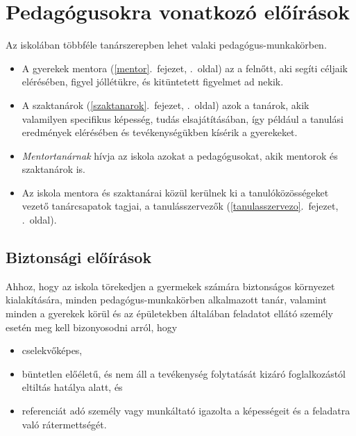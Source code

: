 \hypertarget{pedagogusokra-vonatkozo-eloirasok}{%
\section{Pedagógusokra vonatkozó
előírások}\label{pedagogusokra-vonatkozo-eloirasok}}

Az iskolában többféle tanárszerepben lehet valaki pedagógus-mun\-ka\-kör\-ben.

\begin{itemize}
\tightlist
\item
  A gyerekek mentora (\ref{mentor}.~fejezet, \pageref{mentor}.~oldal)
  az a felnőtt, aki segíti céljaik elérésében, figyel jóllétükre, és
  kitüntetett figyelmet ad nekik.
\item
  A
  szaktanárok (\ref{szaktanarok}.~fejezet, \pageref{szaktanarok}.~oldal)
  azok a tanárok, akik valamilyen specifikus képesség, tudás elsajátításában, így például a tanulási
  eredmények elérésében
  és tevékenységükben kísérik a gyerekeket.
\item
  \emph{Mentortanárnak} hívja az iskola azokat a pedagógusokat, akik
  mentorok és szaktanárok is.
\item
  Az iskola mentora és szaktanárai közül kerülnek ki a
  tanulóközösségeket vezető tanárcsapatok tagjai, a
  tanulásszervezők (\ref{tanulasszervezo}.~fejezet, \pageref{tanulasszervezo}.~oldal).
\end{itemize}

\hypertarget{biztonsagi-eloirasok}{%
\subsection{Biztonsági előírások}\label{biztonsagi-eloirasok}}

Ahhoz, hogy az iskola törekedjen a gyermekek számára biztonságos
környezet kialakítására, minden pedagógus-munkakörben alkalmazott tanár,
valamint minden a gyerekek körül és az épületekben általában feladatot
ellátó személy esetén meg kell bizonyosodni arról, hogy

\begin{itemize}
\tightlist
\item
  cselekvőképes,
\item
  büntetlen előéletű, és nem áll a tevékenység folytatását kizáró
  foglalkozástól eltiltás hatálya alatt, és
\item
  referenciát adó személy vagy munkáltató igazolta a
  képességeit és a feladatra való rátermettségét.
\end{itemize}

